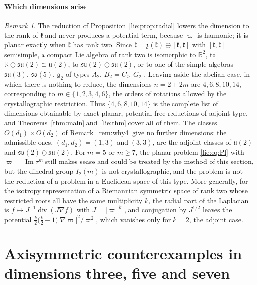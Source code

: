 \documentclass[11pt]{amsart}
\theoremstyle{definition}
\theoremstyle{remark}
\newtheorem{remark}[theorem]{Remark}
\numberwithin{equation}{section}
\newcommand{\R}{\mathbb{R}}
\DeclareMathOperator{\im}{Im}
\newcommand{\kf}{\mathfrak{k}}
\begin{document}
\subsection{Which dimensions arise}\label{lie:subsec:complete}

\begin{remark}\label{lie:rem:complete}
The reduction of Proposition~\ref{lie:prop:radial} lowers the dimension to the rank of $\kf$ and never produces a potential term, because $\varpi$ is harmonic; it is planar exactly when $\kf$ has rank two. Since $\kf=\mathfrak z(\kf)\oplus[\kf,\kf]$ with $[\kf,\kf]$ semisimple, a compact Lie algebra of rank two is isomorphic to $\R^2$, to $\R\oplus\mathfrak{su}(2)\cong\mathfrak u(2)$, to $\mathfrak{su}(2)\oplus\mathfrak{su}(2)$, or to one of the simple algebras $\mathfrak{su}(3)$, $\mathfrak{so}(5)$, $\mathfrak g_2$ of types $A_2$, $B_2=C_2$, $G_2$ \cite{BtD85,Kna02}. Leaving aside the abelian case, in which there is nothing to reduce, the dimensions $n=2+2m$ are $4,6,8,10,14$, corresponding to $m\in\{1,2,3,4,6\}$, the orders of rotations allowed by the crystallographic restriction. Thus $\{4,6,8,10,14\}$ is the complete list of dimensions obtainable by exact planar, potential-free reductions of adjoint type, and Theorems~\ref{thm:main} and~\ref{lie:thm} cover all of them. The classes $O(d_1)\times O(d_2)$ of Remark~\ref{rem:why4} give no further dimensions: the admissible ones, $(d_1,d_2)=(1,3)$ and $(3,3)$, are the adjoint classes of $\mathfrak u(2)$ and $\mathfrak{su}(2)\oplus\mathfrak{su}(2)$. For $m=5$ or $m\geq7$, the planar problem \eqref{lie:eq:Pl} with $\varpi=\im\tau^m$ still makes sense and could be treated by the method of this section, but the dihedral group $I_2(m)$ is not crystallographic, and the problem is not the reduction of a problem in a Euclidean space of this type. More generally, for the isotropy representation of a Riemannian symmetric space of rank two whose restricted roots all have the same multiplicity $k$, the radial part of the Laplacian is $f\mapsto J^{-1}\operatorname{div}(J\nabla f)$ with $J=|\varpi|^k$ \cite[Ch.~II]{Hel84}, and conjugation by $J^{1/2}$ leaves the potential $\frac k2\big(\frac k2-1\big)|\nabla\varpi|^2/\varpi^2$, which vanishes only for $k=2$, the adjoint case.
\end{remark}

\part{Axisymmetric counterexamples in dimensions three, five and seven}\label{part:r3}
\end{document}
